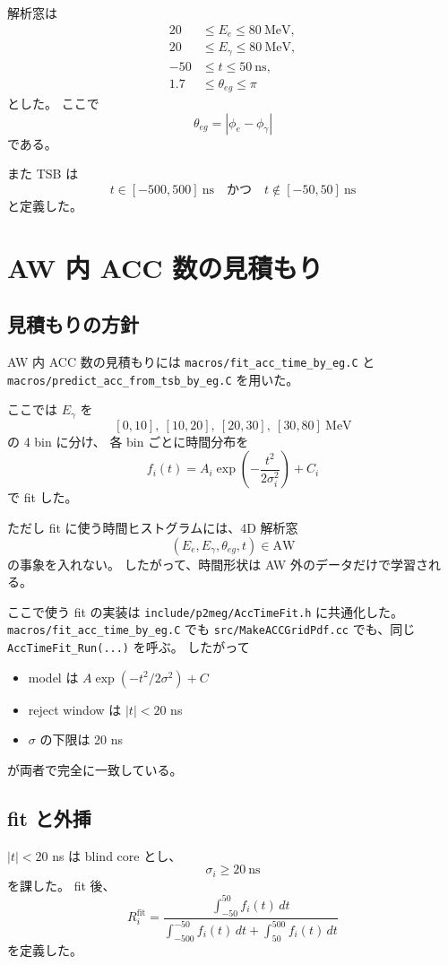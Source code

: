 \documentclass[a4paper,11pt]{jsarticle}
\begin{document}
解析窓は
\begin{align}
20 &\le E_e \le 80 \ \mathrm{MeV},\\
20 &\le E_\gamma \le 80 \ \mathrm{MeV},\\
-50 &\le t \le 50 \ \mathrm{ns},\\
1.7 &\le \theta_{eg} \le \pi
\end{align}
とした。
ここで
\[
\theta_{eg}=|\phi_e-\phi_\gamma|
\]
である。

また TSB は
\[
t\in[-500,500]\ \mathrm{ns}
\quad\text{かつ}\quad
t\notin[-50,50]\ \mathrm{ns}
\]
と定義した。

\section{AW 内 ACC 数の見積もり}
\subsection{見積もりの方針}
AW 内 ACC 数の見積もりには
\texttt{macros/fit\_acc\_time\_by\_eg.C}
と
\texttt{macros/predict\_acc\_from\_tsb\_by\_eg.C}
を用いた。

ここでは \(E_\gamma\) を
\[
[0,10],\ [10,20],\ [20,30],\ [30,80]\ \mathrm{MeV}
\]
の 4 bin に分け、
各 bin ごとに時間分布を
\[
f_i(t)=A_i\exp\left(-\frac{t^2}{2\sigma_i^2}\right)+C_i
\]
で fit した。

ただし fit に使う時間ヒストグラムには、4D 解析窓
\[
(E_e,E_\gamma,\theta_{eg},t)\in\mathrm{AW}
\]
の事象を入れない。
したがって、時間形状は AW 外のデータだけで学習される。

ここで使う fit の実装は
\texttt{include/p2meg/AccTimeFit.h}
に共通化した。
\texttt{macros/fit\_acc\_time\_by\_eg.C} でも
\texttt{src/MakeACCGridPdf.cc} でも、同じ
\texttt{AccTimeFit\_Run(...)} を呼ぶ。
したがって
\begin{itemize}
  \item model は \(A\exp(-t^2/2\sigma^2)+C\)
  \item reject window は \(|t|<20\) ns
  \item \(\sigma\) の下限は 20 ns
\end{itemize}
が両者で完全に一致している。

\subsection{fit と外挿}
\(|t|<20\) ns は blind core とし、
\[
\sigma_i \ge 20\ \mathrm{ns}
\]
を課した。
fit 後、
\begin{equation}
R_i^{\mathrm{fit}}=
\frac{\int_{-50}^{50} f_i(t)\,dt}
{\int_{-500}^{-50} f_i(t)\,dt+\int_{50}^{500} f_i(t)\,dt}
\end{equation}
を定義した。
\end{document}
